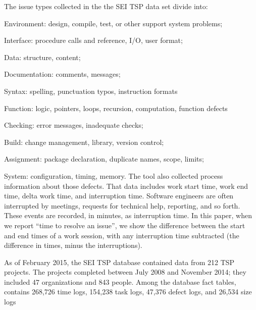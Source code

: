 The issue types collected in the the SEI TSP data set divide into:
\be 
\item Environment: design, compile, test, or other support system problems;
\item Interface: procedure calls and reference, I/O, user format;
\item Data: structure, content; 
\item Documentation: comments, messages;
\item Syntax: spelling, punctuation typos, instruction formats
\item Function: logic, pointers, loops, recursion, computation, function defects  
\item Checking: error messages, inadequate checks;
\item Build: change management, library, version control;
\item Assignment: package
declaration, duplicate names, scope, limits;
\item System: configuration, timing, memory.
\ee
The tool also collected process information about those defects.
That data includes  work start time, work end time, delta
work time, and interruption time. Software engineers are often
interrupted by meetings, requests for technical help, reporting, and
so forth. These events are recorded, in minutes, as interruption
time. In this paper, when we report ``time to resolve an
issue'', we show the difference between the start and end times
of a work session, with any interruption time subtracted (the
difference in times, minus the interruptions).  

As of February 2015, the SEI TSP database contained data from 212
TSP projects. The projects completed between July 2008 and
November 2014; they included 47 organizations and 843 people. Among
the database fact tables, 
contains 268,726 time logs, 
154,238 task logs,
 47,376 defect logs, 
and 26,534 size logs


%
 
